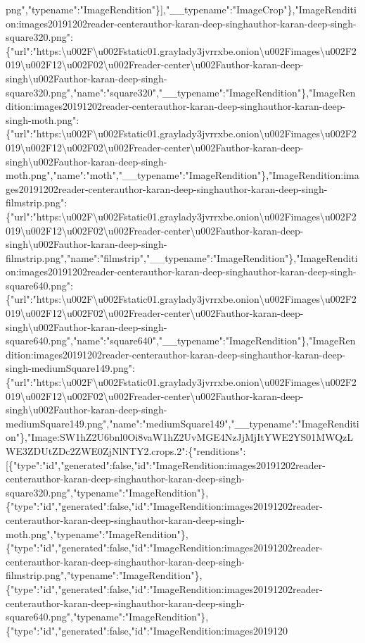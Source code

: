 png","typename":"ImageRendition"\}{]},"\_\_typename":"ImageCrop"\},"ImageRendition:images20191202reader-centerauthor-karan-deep-singhauthor-karan-deep-singh-square320.png":\{"url":"https:\textbackslash{}u002F\textbackslash{}u002Fstatic01.graylady3jvrrxbe.onion\textbackslash{}u002Fimages\textbackslash{}u002F2019\textbackslash{}u002F12\textbackslash{}u002F02\textbackslash{}u002Freader-center\textbackslash{}u002Fauthor-karan-deep-singh\textbackslash{}u002Fauthor-karan-deep-singh-square320.png","name":"square320","\_\_typename":"ImageRendition"\},"ImageRendition:images20191202reader-centerauthor-karan-deep-singhauthor-karan-deep-singh-moth.png":\{"url":"https:\textbackslash{}u002F\textbackslash{}u002Fstatic01.graylady3jvrrxbe.onion\textbackslash{}u002Fimages\textbackslash{}u002F2019\textbackslash{}u002F12\textbackslash{}u002F02\textbackslash{}u002Freader-center\textbackslash{}u002Fauthor-karan-deep-singh\textbackslash{}u002Fauthor-karan-deep-singh-moth.png","name":"moth","\_\_typename":"ImageRendition"\},"ImageRendition:images20191202reader-centerauthor-karan-deep-singhauthor-karan-deep-singh-filmstrip.png":\{"url":"https:\textbackslash{}u002F\textbackslash{}u002Fstatic01.graylady3jvrrxbe.onion\textbackslash{}u002Fimages\textbackslash{}u002F2019\textbackslash{}u002F12\textbackslash{}u002F02\textbackslash{}u002Freader-center\textbackslash{}u002Fauthor-karan-deep-singh\textbackslash{}u002Fauthor-karan-deep-singh-filmstrip.png","name":"filmstrip","\_\_typename":"ImageRendition"\},"ImageRendition:images20191202reader-centerauthor-karan-deep-singhauthor-karan-deep-singh-square640.png":\{"url":"https:\textbackslash{}u002F\textbackslash{}u002Fstatic01.graylady3jvrrxbe.onion\textbackslash{}u002Fimages\textbackslash{}u002F2019\textbackslash{}u002F12\textbackslash{}u002F02\textbackslash{}u002Freader-center\textbackslash{}u002Fauthor-karan-deep-singh\textbackslash{}u002Fauthor-karan-deep-singh-square640.png","name":"square640","\_\_typename":"ImageRendition"\},"ImageRendition:images20191202reader-centerauthor-karan-deep-singhauthor-karan-deep-singh-mediumSquare149.png":\{"url":"https:\textbackslash{}u002F\textbackslash{}u002Fstatic01.graylady3jvrrxbe.onion\textbackslash{}u002Fimages\textbackslash{}u002F2019\textbackslash{}u002F12\textbackslash{}u002F02\textbackslash{}u002Freader-center\textbackslash{}u002Fauthor-karan-deep-singh\textbackslash{}u002Fauthor-karan-deep-singh-mediumSquare149.png","name":"mediumSquare149","\_\_typename":"ImageRendition"\},"Image:SW1hZ2U6bnl0Oi8vaW1hZ2UvMGE4NzJjMjItYWE2YS01MWQzLWE3ZDUtZDc2ZWE0ZjNlNTY2.crops.2":\{"renditions":{[}\{"type":"id","generated":false,"id":"ImageRendition:images20191202reader-centerauthor-karan-deep-singhauthor-karan-deep-singh-square320.png","typename":"ImageRendition"\},\{"type":"id","generated":false,"id":"ImageRendition:images20191202reader-centerauthor-karan-deep-singhauthor-karan-deep-singh-moth.png","typename":"ImageRendition"\},\{"type":"id","generated":false,"id":"ImageRendition:images20191202reader-centerauthor-karan-deep-singhauthor-karan-deep-singh-filmstrip.png","typename":"ImageRendition"\},\{"type":"id","generated":false,"id":"ImageRendition:images20191202reader-centerauthor-karan-deep-singhauthor-karan-deep-singh-square640.png","typename":"ImageRendition"\},\{"type":"id","generated":false,"id":"ImageRendition:images2019120
